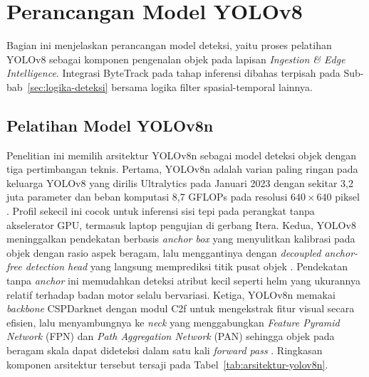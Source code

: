 \section{Perancangan Model YOLOv8}
Bagian ini menjelaskan perancangan model deteksi, yaitu proses pelatihan YOLOv8 sebagai komponen pengenalan objek pada lapisan \textit{Ingestion \& Edge Intelligence}. Integrasi ByteTrack pada tahap inferensi dibahas terpisah pada Sub-bab~\ref{sec:logika-deteksi} bersama logika filter spasial-temporal lainnya.

\subsection{Pelatihan Model YOLOv8n}
\label{subsec:pelatihan-yolov8n}
Penelitian ini memilih arsitektur YOLOv8n sebagai model deteksi objek dengan tiga pertimbangan teknis. Pertama, YOLOv8n adalah varian paling ringan pada keluarga YOLOv8 yang dirilis Ultralytics pada Januari 2023 dengan sekitar 3,2 juta parameter dan beban komputasi 8,7 GFLOPs pada resolusi $640 \times 640$ piksel \cite{jocher2023yolo,terven2023yoloreview}. Profil sekecil ini cocok untuk inferensi sisi tepi pada perangkat tanpa akselerator GPU, termasuk laptop pengujian di gerbang Itera. Kedua, YOLOv8 meninggalkan pendekatan berbasis \textit{anchor box} yang menyulitkan kalibrasi pada objek dengan rasio aspek beragam, lalu menggantinya dengan \textit{decoupled anchor-free detection head} yang langsung memprediksi titik pusat objek \cite{yaseen2024yolov8indepthexplorationinternal}. Pendekatan tanpa \textit{anchor} ini memudahkan deteksi atribut kecil seperti helm yang ukurannya relatif terhadap badan motor selalu bervariasi. Ketiga, YOLOv8n memakai \textit{backbone} CSPDarknet dengan modul C2f untuk mengekstrak fitur visual secara efisien, lalu menyambungnya ke \textit{neck} yang menggabungkan \textit{Feature Pyramid Network} (FPN) dan \textit{Path Aggregation Network} (PAN) sehingga objek pada beragam skala dapat dideteksi dalam satu kali \textit{forward pass} \cite{lenawala2023yolov8,terven2023yoloreview}. Ringkasan komponen arsitektur tersebut tersaji pada Tabel~\ref{tab:arsitektur-yolov8n}.

